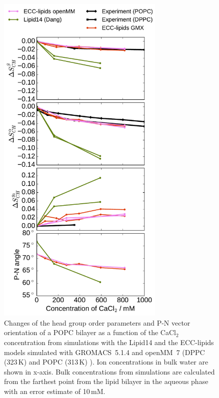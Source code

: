 \documentclass[aip,jcp,twocolumn]{revtex4}
\begin{document}
\begin{figure}[tbp!]
  \centering
  \includegraphics[width=8.0cm]{../Fig/ipython_nb/PN_angle_OrdPars-A-B-g3_L14-ECCL17_q80_sig89_CaCl_GMX-oMM_compar.pdf}
  \caption{\label{fig:ordPars_cacl_GMX_oMM_compar}
    Changes of the head group order parameters and P-N vector orientation of a POPC bilayer 
    as a function of the CaCl$_2$ concentration
    from simulations with the Lipid14 \cite{dickson14} and the ECC-lipids models
    simulated with GROMACS~5.1.4 \cite{Abraham15} and openMM~7 \cite{openmm7} 
    (DPPC (323\,K) \cite{akutsu81} and POPC (313\,K) \cite{altenbach84}). 
    Ion concentrations in bulk water are shown in x-axis. 
    Bulk concentrations from simulations are calculated 
    from the farthest point from the lipid bilayer in the aqueous phase
    with an error estimate of 10\,mM.
  }
\end{figure}




\listoftodos
\end{document}

